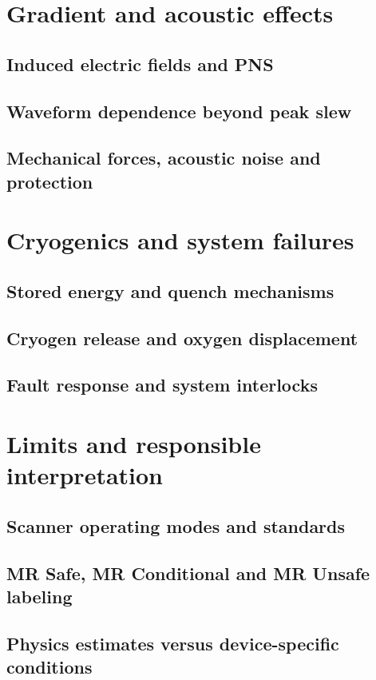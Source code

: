 \section{Gradient and acoustic effects}
\label{sec:26:gradient-and-acoustic-effects}
\subsection{Induced electric fields and PNS}
\subsection{Waveform dependence beyond peak slew}
\subsection{Mechanical forces, acoustic noise and protection}

\section{Cryogenics and system failures}
\label{sec:26:cryogenics-and-system-failures}
\subsection{Stored energy and quench mechanisms}
\subsection{Cryogen release and oxygen displacement}
\subsection{Fault response and system interlocks}

\section{Limits and responsible interpretation}
\label{sec:26:limits-and-responsible-interpretation}
\subsection{Scanner operating modes and standards}
\subsection{MR Safe, MR Conditional and MR Unsafe labeling}
\subsection{Physics estimates versus device-specific conditions}

